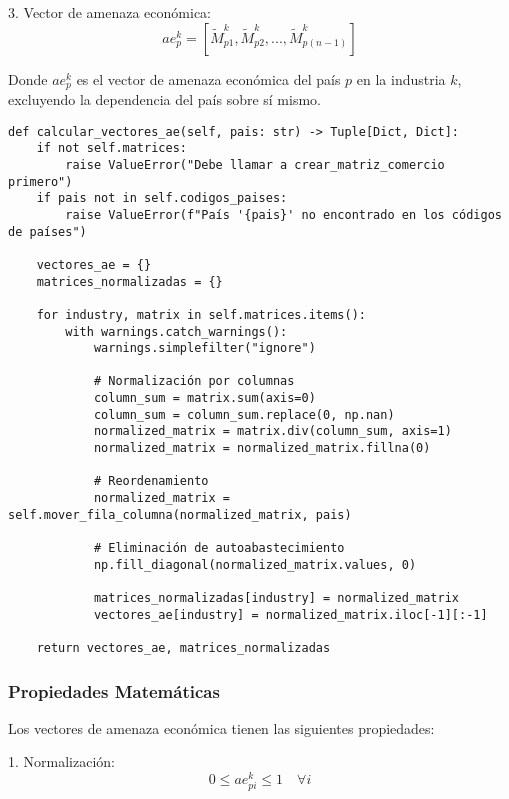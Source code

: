 \documentclass[11pt,a4paper]{article}
\begin{document}
3. Vector de amenaza económica:
\begin{equation}
ae^k_p = [\tilde{M}^k_{p1}, \tilde{M}^k_{p2}, ..., \tilde{M}^k_{p(n-1)}]
\end{equation}

Donde $ae^k_p$ es el vector de amenaza económica del país $p$ en la industria $k$, excluyendo la dependencia del país sobre sí mismo.

\begin{tcolorbox}[colback=codebackground,title=Implementación del Método]
\begin{lstlisting}
def calcular_vectores_ae(self, pais: str) -> Tuple[Dict, Dict]:
    if not self.matrices:
        raise ValueError("Debe llamar a crear_matriz_comercio primero")
    if pais not in self.codigos_paises:
        raise ValueError(f"País '{pais}' no encontrado en los códigos de países")
        
    vectores_ae = {}
    matrices_normalizadas = {}
    
    for industry, matrix in self.matrices.items():
        with warnings.catch_warnings():
            warnings.simplefilter("ignore")
            
            # Normalización por columnas
            column_sum = matrix.sum(axis=0)
            column_sum = column_sum.replace(0, np.nan)
            normalized_matrix = matrix.div(column_sum, axis=1)
            normalized_matrix = normalized_matrix.fillna(0)
            
            # Reordenamiento
            normalized_matrix = self.mover_fila_columna(normalized_matrix, pais)
            
            # Eliminación de autoabastecimiento
            np.fill_diagonal(normalized_matrix.values, 0)
            
            matrices_normalizadas[industry] = normalized_matrix
            vectores_ae[industry] = normalized_matrix.iloc[-1][:-1]
    
    return vectores_ae, matrices_normalizadas
\end{lstlisting}
\end{tcolorbox}

\subsubsection{Propiedades Matemáticas}

Los vectores de amenaza económica tienen las siguientes propiedades:

1. Normalización:
\begin{equation}
0 \leq ae^k_{pi} \leq 1 \quad \forall i
\end{equation}
\end{document}
